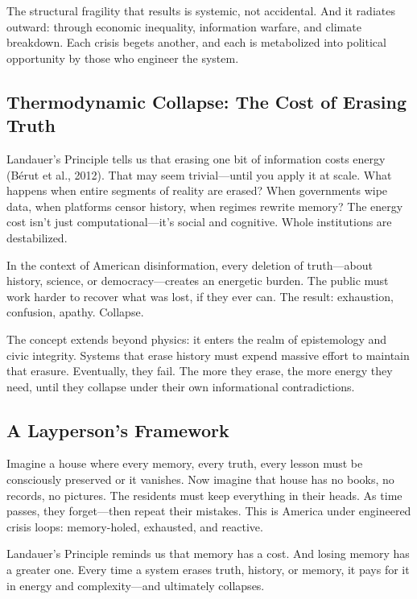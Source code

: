 \documentclass[
]{article}
\begin{document}
The structural fragility that results is systemic, not accidental. And it radiates outward: through economic inequality, information warfare, and climate breakdown. Each crisis begets another, and each is metabolized into political opportunity by those who engineer the system.

\subsection{Thermodynamic Collapse: The Cost of Erasing Truth}\label{thermodynamic-collapse-the-cost-of-erasing-truth}

Landauer's Principle tells us that erasing one bit of information costs energy (Bérut et al., 2012). That may seem trivial---until you apply it at scale. What happens when entire segments of reality are erased? When governments wipe data, when platforms censor history, when regimes rewrite memory? The energy cost isn't just computational---it's social and cognitive. Whole institutions are destabilized.

In the context of American disinformation, every deletion of truth---about history, science, or democracy---creates an energetic burden. The public must work harder to recover what was lost, if they ever can. The result: exhaustion, confusion, apathy. Collapse.

The concept extends beyond physics: it enters the realm of epistemology and civic integrity. Systems that erase history must expend massive effort to maintain that erasure. Eventually, they fail. The more they erase, the more energy they need, until they collapse under their own informational contradictions.

\subsection{A Layperson's Framework}\label{a-laypersons-framework}

Imagine a house where every memory, every truth, every lesson must be consciously preserved or it vanishes. Now imagine that house has no books, no records, no pictures. The residents must keep everything in their heads. As time passes, they forget---then repeat their mistakes. This is America under engineered crisis loops: memory-holed, exhausted, and reactive.

Landauer's Principle reminds us that memory has a cost. And losing memory has a greater one. Every time a system erases truth, history, or memory, it pays for it in energy and complexity---and ultimately collapses.
\end{document}
